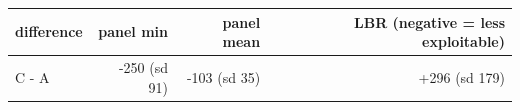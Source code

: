 \begin{tabular}{lrrr}
\toprule
difference & panel min & panel mean & LBR (negative = less exploitable) \\
\midrule
C - A & -250 (sd 91) & -103 (sd 35) & +296 (sd 179) \\
\bottomrule
\end{tabular}
